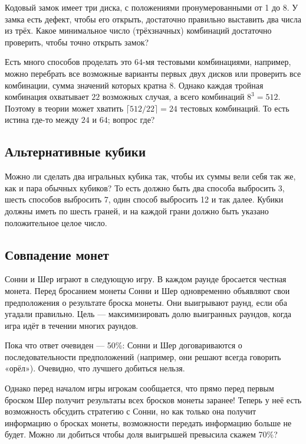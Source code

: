 Кодовый замок имеет три диска, с положениями пронумерованными от 1 до 8.
У замка есть дефект, чтобы его открыть, достаточно правильно выставить два числа из трёх.
Какое минимальное число (трёхзначных) комбинаций достаточно проверить, чтобы точно открыть замок?

Есть много способов проделать это $64$-мя тестовыми комбинациями, например, можно перебрать все возможные варианты первых двух дисков или проверить все комбинации, сумма значений которых кратна 8.
Однако каждая тройная комбинация охватывает $22$ возможных случая, а всего комбинаций $8^3 = 512$. 
Поэтому в теории может хватить $\lceil 512/22 \rceil = 24$ тестовых комбинаций.
То есть истина где-то между $24$ и $64$; вопрос где?

\subsection*{Альтернативные кубики}

Можно ли сделать два игральных кубика так, чтобы их суммы вели себя так же, как и пара обычных кубиков?
То есть должно быть два способа выбросить 3, шесть способов выбросить 7, один способ выбросить 12 и так далее. Кубики должны иметь по шесть граней, и на каждой грани должно быть указано положительное целое число.

\subsection*{Совпадение монет}

Сонни и Шер играют в следующую игру.
В каждом раунде бросается честная монета.
Перед бросанием монеты Сонни и Шер одновременно объявляют свои предположения о результате броска монеты.
Они выигрывают раунд, если оба угадали правильно.
Цель --- максимизировать долю выигранных раундов, когда игра идёт в течении многих раундов.

Пока что ответ очевиден --- 50\%: Сонни и Шер договариваются о последовательности предположений (например, они решают всегда говорить «орёл»).
Очевидно, что лучшего добиться нельзя.

Однако перед началом игры игрокам сообщается, что прямо перед первым броском Шер получит результаты всех бросков монеты заранее!
Теперь у неё есть возможность обсудить стратегию с Сонни, но как только она получит информацию о бросках монеты, возможности передать информацию больше не будет.
Можно ли добиться чтобы доля выигрышей превысила скажем 70\%?

